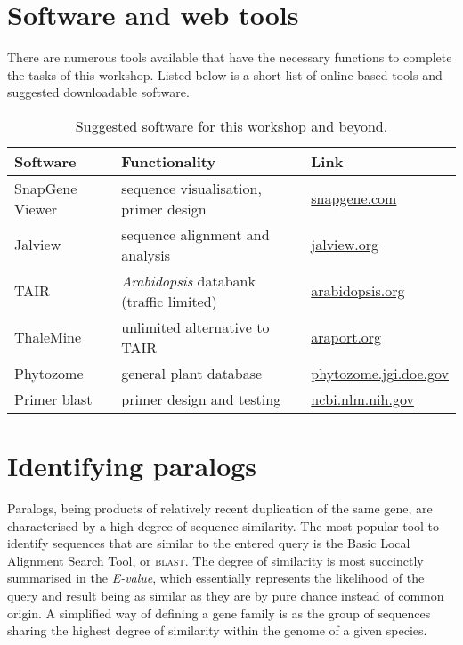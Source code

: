 \documentclass[11pt]{article}
\begin{document}
 	\section*{Software and web tools}
 	
 	There are numerous tools available that have the necessary functions to complete the tasks of this workshop. Listed below is a short list of online based tools and suggested downloadable software.
 	
 	\begin{table}[h!]
 	\footnotesize
 	\caption{Suggested software for this workshop and beyond.}
 	\centering
 	\begin{tabular}{@{}lll}
 		\toprule
 		Software & Functionality & Link \\
 		\midrule
 		SnapGene Viewer	& sequence visualisation, primer design & \href{https://www.snapgene.com/snapgene-viewer/}{snapgene.com} \\ 
 		Jalview & sequence alignment and analysis & \href{http://www.jalview.org/getdown/release/#}{jalview.org}\\
 		TAIR & \textit{Arabidopsis} databank (traffic limited) & \href{https://www.arabidopsis.org}{arabidopsis.org} \\ 
 		ThaleMine & unlimited alternative to TAIR &  \href{https://apps.araport.org/thalemine/begin.do}{araport.org} \\ 
 		Phytozome & general plant database & \href{https://phytozome.jgi.doe.gov/pz/portal.html#}{phytozome.jgi.doe.gov}\\ 
 		Primer blast & primer design and testing & \href{https://www.ncbi.nlm.nih.gov/tools/primer-blast/}{ncbi.nlm.nih.gov} \\
 		\bottomrule
 	\end{tabular}
  	\end{table}
 
	\section{Identifying paralogs\label{sec:find}}
	
	Paralogs, being products of relatively recent duplication of the same gene, are characterised by a high degree of sequence similarity. 
	The most popular tool to identify sequences that are similar to the entered query is the Basic Local Alignment Search Tool, or \textsc{blast}. 
	The degree of similarity is most succinctly summarised in the \textit{E-value}, which essentially represents the likelihood of the query and result being as similar as they are by pure chance instead of common origin.
	A simplified way of defining a gene family is as the group of sequences sharing the highest degree of similarity within the genome of a given species.
	
\end{document}
